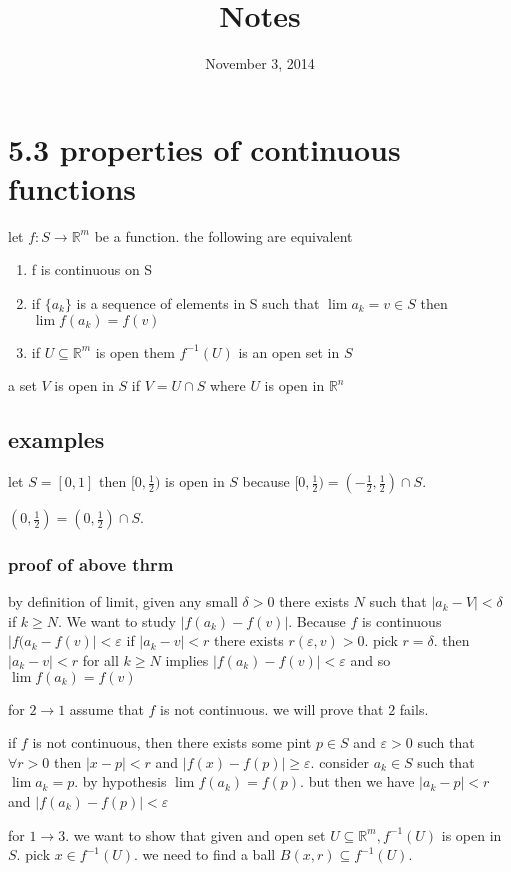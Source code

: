 \documentclass[letterpaper]{article}
\begin{document}
\title{Notes}
\date{November 3, 2014}
\maketitle
\section*{5.3 properties of continuous functions}
let $f:S\to \mathbb{R}^m$ be a function. the following are equivalent
\begin{enumerate}
\item
  f is continuous on S
\item
  if $\{a_k\}$ is a sequence of elements in S such that $\lim a_k=v\in S$ then $\lim f(a_k)=f(v)$
\item
  if $U\subseteq \mathbb{R}^m$ is open them $f^{-1}(U)$ is an open set in $S$
\end{enumerate}

a set $V$ is open in $S$ if $V=U\cap S$ where $U$ is open in $\mathbb{R}^n$ 

\subsection*{examples}
let $S=[0,1]$
then $[0,\frac{1}{2})$ is open in $S$ because $[0,\frac{1}{2})=(-\frac{1}{2},\frac{1}{2})\cap S$.

$(0,\frac{1}{2})=(0,\frac{1}{2})\cap S$.

\subsubsection*{proof of above thrm}
by definition of limit, given any small $\delta>0$ there exists $N$ such that $|a_k-V|<\delta$ if $k\ge N$. We want to study $|f(a_k)-f(v)|$. Because $f$ is continuous $|f(a_k-f(v)|<\varepsilon$ if $|a_k-v|<r$ there exists $r(\varepsilon,v)>0$. pick $r=\delta$. then $|a_k-v|<r$ for all $k\ge N$ implies $|f(a_k)-f(v)|< \varepsilon$ and so $\lim f(a_k)=f(v)$

for $2\to1$ assume that $f$ is not continuous. we will prove that $2$ fails.

if $f$ is not continuous, then there exists some pint $p\in S$ and $\varepsilon>0$ such that $\forall r>0$ then $|x-p|<r$ and $|f(x)-f(p)|\ge \varepsilon$. consider $a_k\in S$ such that $\lim a_k=p$. by hypothesis $\lim f(a_k)=f(p)$. but then we have $|a_k-p|<r$ and $|f(a_k)-f(p)|<\varepsilon$

for $1\to3$. we want to show that given and open set $U\subseteq \mathbb{R}^m, f^{-1}(U)$ is open  in $S$. pick $x\in f^{-1}(U)$. we need to find a ball $B(x,r)\subseteq f^{-1}(U)$.
\end{document}
